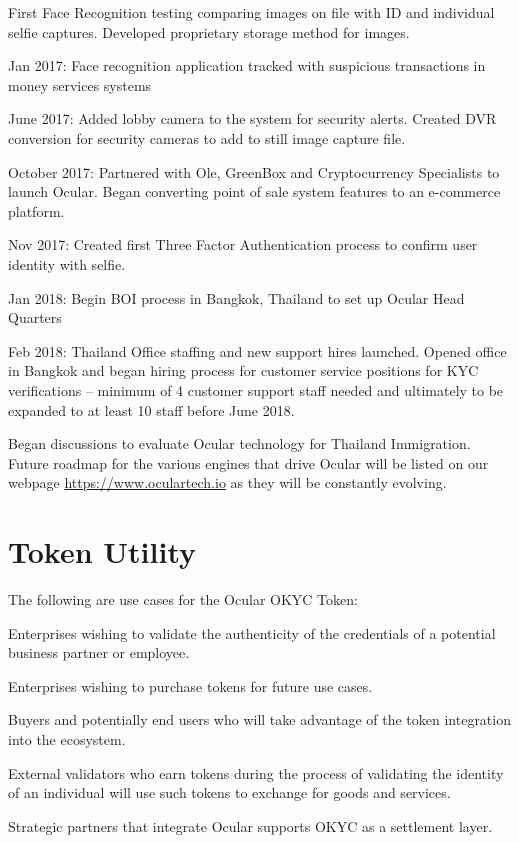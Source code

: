 \documentclass[a4paper]{article}
\let\tempone\itemize
\let\temptwo\enditemize
\renewenvironment{itemize}{\tempone\addtolength{\itemsep}{-5pt}}{\temptwo}
\begin{document}
\begin{itemize}
\item First Face Recognition testing comparing images on file with ID and individual selfie captures. Developed proprietary storage method for images.
\item Jan 2017: Face recognition application tracked with suspicious transactions in money services systems
\item June 2017: Added lobby camera to the system for security alerts. Created DVR conversion for security cameras to add to still image capture file.
\item October 2017: Partnered with Ole, GreenBox and Cryptocurrency Specialists to launch Ocular. Began converting point of sale system features to an e-commerce platform.
\item Nov 2017: Created first Three Factor Authentication process to confirm user identity with selfie.
\item Jan 2018: Begin BOI process in Bangkok, Thailand to set up Ocular Head Quarters
\item Feb 2018: Thailand Office staffing and new support hires launched. Opened office in Bangkok and began hiring process for customer service positions for KYC verifications – minimum of 4 customer support staff needed and ultimately to be expanded to at least 10 staff before June 2018.
\item Began discussions to evaluate Ocular technology for Thailand Immigration.
 \end{itemize}
Future roadmap for the various engines that drive Ocular will be listed on our webpage \url{https://www.oculartech.io} as they will be constantly evolving.
\newpage
\section{Token Utility}
The following are use cases for the Ocular OKYC Token: 
\begin{itemize}
  \item Enterprises wishing to validate the authenticity of the credentials of a potential business partner or employee.
  \item Enterprises wishing to purchase tokens for future use cases.
  \item Buyers and potentially end users who will take advantage of the token integration into the ecosystem.
  \item External validators who earn tokens during the process of validating the identity of an individual will use such tokens to exchange for goods and services.
  \item Strategic partners that integrate Ocular supports OKYC as a settlement layer. 
\end{itemize}
\end{document}
